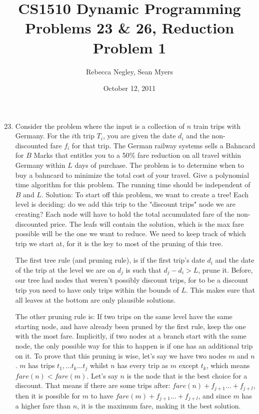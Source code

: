 \documentclass{article}
\title{CS1510  Dynamic Programming Problems 23 \& 26, Reduction Problem 1}
\author{Rebecca Negley, Sean Myers}
\date{October 12, 2011}
\begin{document}
\maketitle

\begin{enumerate}
\setcounter{enumi}{22}
\item Consider the problem where the input is a collection of $n$ train trips with Germany. For the $i$th trip $T_i$, you are given the date $d_i$ and the non-discounted fare $f_i$ for that trip. The German railway systems sells a Bahncard for $B$ Marks that entitles you to a 50\% fare reduction on all travel within Germany within $L$ days of purchase. The problem is to determine when to buy a bahncard to minimize the total cost of your travel. Give a polynomial time algorithm for this problem. The running time should be independent of $B$ and $L$.
\newline
\newline Solution: To start off this problem, we want to create a tree! Each level is deciding: do we add this trip to the "discount trips" node we are creating? Each node will have to hold the total accumulated fare of the non-discounted price. The leafs will contain the solution, which is the max fare possible will be the one we want to reduce. We need to keep track of which trip we start at, for it is the key to most of the pruning of this tree. 

The first tree rule (and pruning rule), is if the first trip's date $d_i$ and the date of the trip at the level we are on $d_j$ is such that $d_j-d_i > L$, prune it. Before, our tree had nodes that weren't possibly discount trips, for to be a discount trip you need to have only trips within the bounds of $L$. This makes sure that all leaves at the bottom are only plausible solutions.

The other pruning rule is: If two trips on the same level have the same starting node, and have already been pruned by the first rule, keep the one with the most fare. Implicitly, if two nodes at a branch start with the same node, the only possible way for this to happen is if one has an additional trip on it. To prove that this pruning is wise, let's say we have two nodes $m$ and $n$. $m$ has trips $t_1, ...t_k...t_j$ whilst $n$ has every trip as $m$ except $t_k$, which means $fare(n) < fare(m)$. Let's say $n$ is the node that is the best choice for a discount. That means if there are some trips after: $fare(n) + f_{j+1}...+f_{j+l}$, then it is possible for $m$ to have $fare(m) + f_{j+1}...+f_{j+l}$, and since $m$ has a higher fare than $n$, it is the maximum fare, making it the best solution. 


\end{enumerate}
\end{document}
